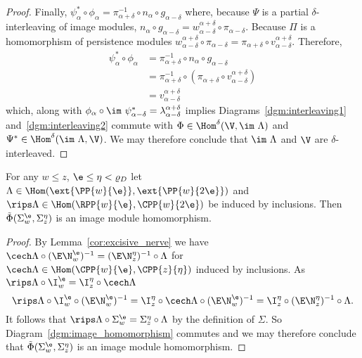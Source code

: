 \begin{proof}
  Finally, $\psi_\alpha^*\circ\phi_\alpha = \pi_{\alpha+\delta}^{-1}\circ n_\alpha\circ g_{\alpha-\delta}$ where, because $\Psi$ is a partial $\delta$-interleaving of image modules, $n_\alpha\circ g_{\alpha-\delta} = w_{\alpha-\delta}^{\alpha+\delta}\circ\pi_{\alpha-\delta}$.
  Because $\Pi$ is a homomorphism of persistence modules $w_{\alpha-\delta}^{\alpha+\delta}\circ \pi_{\alpha-\delta} = \pi_{\alpha+\delta}\circ v_{\alpha-\delta}^{\alpha+\delta}$.
  Therefore,
  \begin{align*}
    \psi_\alpha^*\circ\phi_\alpha &= \pi_{\alpha+\delta}^{-1}\circ n_\alpha\circ g_{\alpha-\delta}\\
      &= \pi_{\alpha+\delta}^{-1}\circ (\pi_{\alpha+\delta}\circ v_{\alpha-\delta}^{\alpha+\delta})\\
      &= v_{\alpha-\delta}^{\alpha+\delta}
  \end{align*}
  which, along with $\phi_\alpha\circ\im~\psi_{\alpha-\delta}^* = \lambda_{\alpha-\delta}^{\alpha+\delta}$ implies Diagrams~\ref{dgm:interleaving1} and~\ref{dgm:interleaving2} commute with $\Phi\in\Hom^\delta(\V,\im~\Lambda)$ and $\Psi^*\in\Hom^\delta(\im~\Lambda, \V)$.
  We may therefore conclude that $\im~\Lambda$ and $\V$ are $\delta$-interleaved.
\end{proof}

\begin{lemma}\label{lem:rips_homomorphism_left}
  For any $w\leq z$, $\e\leq\eta < \varrho_D$ let $\Lambda\in\Hom(\ext{\PP{w}{\e}}, \ext{\PP{w}{2\e}})$ and $\rips\Lambda\in\Hom(\RPP{w}{\e},\CPP{w}{2\e})$ be induced by inclusions.
  Then $\tilde{\Phi}(\Sigma_w^\e,\Sigma_z^\eta)$ is an image module homomorphism.
\end{lemma}
\begin{proof}
  By Lemma~\ref{cor:excisive_nerve} we have $\cech\Lambda\circ (\E\N_w^\e)^{-1} = (\E\N_z^\eta)^{-1}\circ \Lambda$ for $\cech\Lambda\in\Hom(\CPP{w}{\e},\CPP{z}{\eta})$ induced by inclusions.
  As $\rips\Lambda\circ\I_w^\e = \I_z^\eta\circ\cech\Lambda$
  \[ \rips\Lambda\circ \I_w^\e\circ(\E\N_w^\e)^{-1} = \I_z^\eta\circ\cech\Lambda\circ (\E\N_w^\e)^{-1} = \I_z^\eta\circ (\E\N_z^\eta)^{-1}\circ\Lambda.\]
  It follows that $\rips\Lambda\circ\Sigma_w^\e = \Sigma_z^\eta\circ\Lambda$ by the definition of $\Sigma$.
  So Diagram~\ref{dgm:image_homomorphism} commutes and we may therefore conclude that $\tilde{\Phi}(\Sigma_w^\e,\Sigma_z^\eta)$ is an image module homomorphism.
\end{proof}

